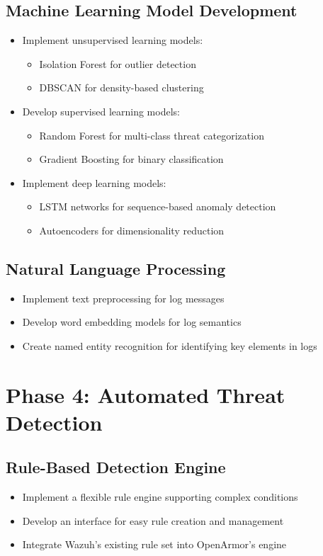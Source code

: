 \subsection{Machine Learning Model Development}
\begin{itemize}
    \item Implement unsupervised learning models:
    \begin{itemize}
        \item Isolation Forest for outlier detection
        \item DBSCAN for density-based clustering
    \end{itemize}
    \item Develop supervised learning models:
    \begin{itemize}
        \item Random Forest for multi-class threat categorization
        \item Gradient Boosting for binary classification
    \end{itemize}
    \item Implement deep learning models:
    \begin{itemize}
        \item LSTM networks for sequence-based anomaly detection
        \item Autoencoders for dimensionality reduction
    \end{itemize}
\end{itemize}

\subsection{Natural Language Processing}
\begin{itemize}
    \item Implement text preprocessing for log messages
    \item Develop word embedding models for log semantics
    \item Create named entity recognition for identifying key elements in logs
\end{itemize}

\section{Phase 4: Automated Threat Detection}

\subsection{Rule-Based Detection Engine}
\begin{itemize}
    \item Implement a flexible rule engine supporting complex conditions
    \item Develop an interface for easy rule creation and management
    \item Integrate Wazuh's existing rule set into OpenArmor's engine
\end{itemize}

